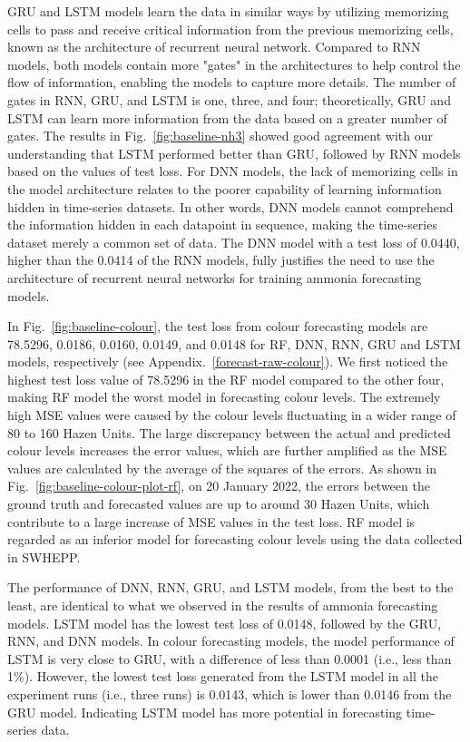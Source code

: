 GRU and LSTM models learn the data in similar ways by utilizing memorizing cells to pass and receive critical information from the previous memorizing cells, known as the architecture of recurrent neural network. Compared to RNN models, both models contain more "gates" in the architectures to help control the flow of information, enabling the models to capture more details. The number of gates in RNN, GRU, and LSTM is one, three, and four; theoretically, GRU and LSTM can learn more information from the data based on a greater number of gates. The results in Fig.~\ref{fig:baseline-nh3} showed good agreement with our understanding that LSTM performed better than GRU, followed by RNN models based on the values of test loss. For DNN models, the lack of memorizing cells in the model architecture relates to the poorer capability of learning information hidden in time-series datasets. In other words, DNN models cannot comprehend the information hidden in each datapoint in sequence, making the time-series dataset merely a common set of data. The DNN model with a test loss of 0.0440, higher than the 0.0414 of the RNN models, fully justifies the need to use the architecture of recurrent neural networks for training ammonia forecasting models.

In Fig.~\ref{fig:baseline-colour}, the test loss from colour forecasting models are 78.5296, 0.0186, 0.0160, 0.0149, and 0.0148 for RF, DNN, RNN, GRU and LSTM models, respectively (see Appendix.~\ref{forecast-raw-colour}). We first noticed the highest test loss value of 78.5296 in the RF model compared to the other four, making RF model the worst model in forecasting colour levels. The extremely high MSE values were caused by the colour levels fluctuating in a wider range of 80 to 160 Hazen Units. The large discrepancy between the actual and predicted colour levels increases the error values, which are further amplified as the MSE values are calculated by the average of the squares of the errors. As shown in Fig.~\ref{fig:baseline-colour-plot-rf}, on 20 January 2022, the errors between the ground truth and forecasted values are up to around 30 Hazen Units, which contribute to a large increase of MSE values in the test loss. RF model is regarded as an inferior model for forecasting colour levels using the data collected in SWHEPP.

The performance of DNN, RNN, GRU, and LSTM models, from the best to the least, are identical to what we observed in the results of ammonia forecasting models. LSTM model has the lowest test loss of 0.0148, followed by the GRU, RNN, and DNN models. In colour forecasting models, the model performance of LSTM is very close to GRU, with a difference of less than 0.0001 (i.e., less than 1\%). However, the lowest test loss generated from the LSTM model in all the experiment runs (i.e., three runs) is 0.0143, which is lower than 0.0146 from the GRU model. Indicating LSTM model has more potential in forecasting time-series data.

